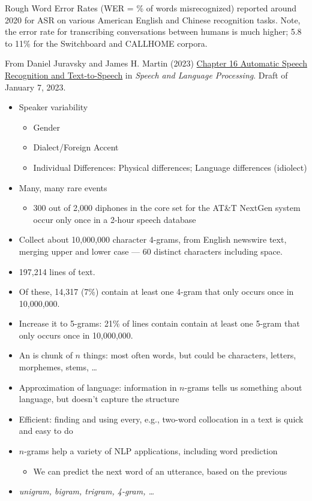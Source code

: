 \documentclass[a4paper,landscape,headrule,footrule,xetex]{foils}
\begin{document}
Rough Word Error Rates (WER = \% of words misrecognized) reported
around 2020 for ASR on various American English and Chinese
recognition tasks.  Note, the error rate for transcribing
conversations between humans is much higher; 5.8 to 11\% for the
Switchboard and CALLHOME corpora.

From Daniel Juravsky and James H. Martin (2023)
\href{https://web.stanford.edu/~jurafsky/slp3/16.pdf}{Chapter 16 Automatic Speech Recognition and Text-to-Speech} in \textit{Speech and Language Processing}. Draft of January 7, 2023.


\begin{itemize}
\item Speaker variability
  \begin{itemize}
  \item Gender
  \item Dialect/Foreign Accent
  \item Individual Differences: Physical differences; Language differences (idiolect)‏
  \end{itemize}
\item Many, many rare events
  \begin{itemize}
  \item 300 out of 2,000 diphones in the core set for the AT\&T NextGen system occur only once in a 2-hour speech database
  \end{itemize}
\end{itemize}
\begin{itemize}
\item Collect about 10,000,000 character 4-grams, from English
  newswire text, merging upper and lower case — 60 distinct characters
  including space.
\item 197,214 lines of text.
\item Of these, 14,317 (7\%) contain at least one 4-gram that only occurs once in 10,000,000.
\item Increase it to 5-grams: 21\% of lines contain contain at least
  one 5-gram that only occurs once in 10,000,000.
\end{itemize}

\begin{itemize}
\item An  is chunk of $n$ things: most often words, but could
  be characters, letters, morphemes, stems, \ldots
 \item Approximation of language: information in $n$-grams tells us something about language, but doesn't capture the structure
 \item Efficient: finding and using every, e.g., two-word collocation in a text is quick and easy to do
 \item $n$-grams help a variety of NLP applications, including word prediction
   \begin{itemize}
   \item We can predict the next word of an utterance, based on the previous 
   \end{itemize}
 \item \textit{unigram, bigram, trigram, 4-gram, \ldots}
\end{itemize}
\end{document}
